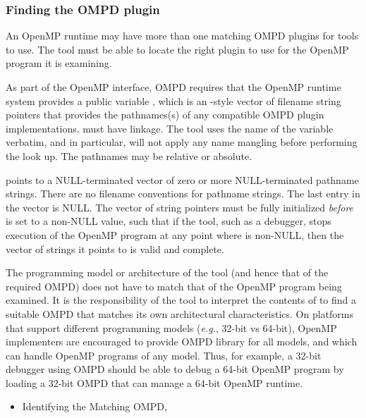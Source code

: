 \subsubsection{Finding the OMPD plugin}
\label{ompd:finding-the-ompd}

An OpenMP runtime may have more than one matching OMPD plugins for 
tools to use.
The tool must be able to locate the right plugin to use
for the OpenMP program it is examining.

As part of the OpenMP interface, OMPD requires that the OpenMP
runtime system provides a public variable ,
which is an -style vector of filename string pointers that
provides the pathnames(s) of any compatible OMPD plugin implementations.
 must have  linkage.
The tool uses the name of the variable verbatim,
and in particular, will not apply any name mangling before
performing the look up.
The pathnames may be relative or absolute.

 points to a NULL-terminated
vector of zero or more NULL-terminated pathname strings.
There are no filename conventions for pathname strings.
The last entry in the vector is NULL.
The vector of string pointers must be fully initialized \emph{before}
 is set to a non-NULL value,
such that if the tool, such as a debugger,
stops execution of the OpenMP program at any point where
 is non-NULL,
then the vector of strings it points to is valid and complete.

The programming model or architecture of the tool (and hence
that of the required OMPD) does not have to match that of the OpenMP program
being examined.
It is the responsibility of the tool to interpret the contents
of  to find a suitable OMPD that matches
its own architectural characteristics.
On platforms that support different programming models
(\textit{e.g.}, 32-bit vs 64-bit), OpenMP implementers are encouraged
to provide OMPD library for all models, and which can handle
OpenMP programs of any model.
Thus, for example, a 32-bit debugger using OMPD should be able
to debug a 64-bit OpenMP program
by loading a 32-bit OMPD that can manage a 64-bit OpenMP runtime.

\crossreferences
\begin{itemize}
	\item Identifying the Matching OMPD, 
\end{itemize}


